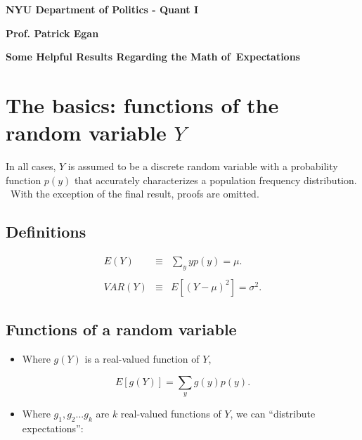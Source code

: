 \documentclass[11pt]{article}
\begin{document}
\singlespacing

\noindent \textbf{NYU Department of Politics - Quant I}

\noindent \textbf{Prof. Patrick Egan}

\bigskip

\begin{center}
\Large{\textbf{Some Helpful Results Regarding the Math of\ Expectations }}

\end{center}

\section{The basics: functions of the random variable $Y$}

\bigskip In all cases, $Y$ is assumed to be a discrete random variable with
a probability function $p(y)$ that accurately characterizes a population
frequency distribution. \ With the exception of the final result, proofs are
omitted. \bigskip 

\subsection{Definitions}

\bigskip

\begin{eqnarray*}
E(Y) &\equiv &\sum_{y}yp(y)=\mu . \\
&& \\
VAR(Y) &\equiv &E[(Y-\mu )^{2}]=\sigma ^{2}.
\end{eqnarray*}%
\bigskip

\subsection{Functions of a random variable\protect\bigskip}

\begin{itemize}
\item Where $g(Y)$ is a real-valued function of $Y$,
\end{itemize}

\begin{equation*}
E[g(Y)]=\sum_{y}g(y)p(y).
\end{equation*}

\begin{itemize}
\item Where $g_{1},g_{2}...g_{k}$ are $k$ real-valued functions of $Y$, we
can \textquotedblleft distribute expectations\textquotedblright :
\end{itemize}
\end{document}
